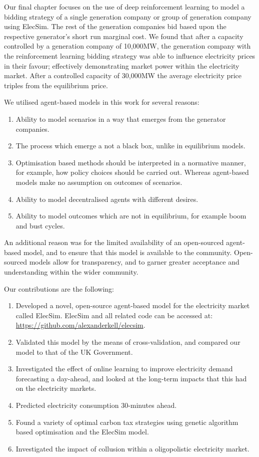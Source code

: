 Our final chapter focuses on the use of deep reinforcement learning to model a bidding strategy of a single generation company or group of generation company using ElecSim. The rest of the generation companies bid based upon the respective generator's short run marginal cost. We found that after a capacity controlled by a generation company of 10,000MW, the generation company with the reinforcement learning bidding strategy was able to influence electricity prices in their favour; effectively demonstrating market power within the electricity market. After a controlled capacity of 30,000MW the average electricity price triples from the equilibrium price. 

We utilised agent-based models in this work for several reasons:
\begin{enumerate}
	\item Ability to model scenarios in a way that emerges from the generator companies.
	\item The process which emerge a not a black box, unlike in equilibrium models.
	\item Optimisation based methods should be interpreted in a normative manner, for example, how policy choices should be carried out. Whereas agent-based models make no assumption on outcomes of scenarios.
	\item Ability to model decentralised agents with different desires.
	\item Ability to model outcomes which are not in equilibrium, for example boom and bust cycles.
\end{enumerate}

An additional reason was for the limited availability of an open-sourced agent-based model, and to ensure that this model is available to the community. Open-sourced models allow for transparency, and to garner greater acceptance and understanding within the wider community. 

Our contributions are the following:

\begin{enumerate}
	\item Developed a novel, open-source agent-based model for the electricity market called ElecSim. ElecSim and all related code can be accessed at: \url{https://github.com/alexanderkell/elecsim}.
	\item Validated this model by the means of cross-validation, and compared our model to that of the UK Government.
	\item Investigated the effect of online learning to improve electricity demand forecasting a day-ahead, and looked at the long-term impacts that this had on the electricity markets.
	\item Predicted electricity consumption 30-minutes ahead.
	\item Found a variety of optimal carbon tax strategies using genetic algorithm based optimisation and the ElecSim model.
	\item Investigated the impact of collusion within a oligopolistic electricity market.
\end{enumerate}


